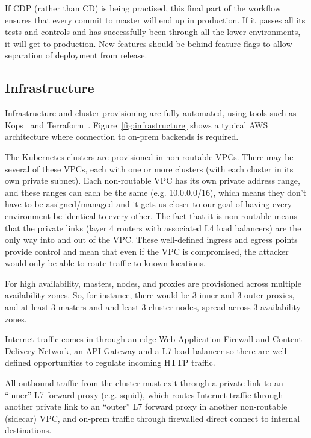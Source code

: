 \documentclass[reprint,amsmath,amssymb,aps]{revtex4-1}
\begin{document}
If CDP (rather than CD) is being practised, this final part of the workflow ensures that every commit to master will end up in production. If it passes all its tests and controls and has successfully been through all the lower environments, it will get to production. New features should be behind feature flags to allow separation of deployment from release.

\subsection{\label{sec:infrastructure}Infrastructure}

Infrastructure and cluster provisioning are fully automated, using tools such as Kops~\cite{kubernet77:online} and Terraform~\cite{Terrafor77:online}. Figure~\ref{fig:infrastructure} shows a typical AWS architecture where connection to on-prem backends is required.

The Kubernetes clusters are provisioned in non-routable VPCs. There may be several of these VPCs, each with one or more clusters (with each cluster in its own private subnet). Each non-routable VPC has its own private address range, and these ranges can each be the same (e.g. 10.0.0.0/16), which means they don't have to be assigned/managed and it gets us closer to our goal of having every environment be identical to every other. The fact that it is non-routable means that the private links (layer 4 routers with associated L4 load balancers) are the only way into and out of the VPC. These well-defined ingress and egress points provide control and mean that even if the VPC is compromised, the attacker would only be able to route traffic to known locations.

For high availability, masters, nodes, and proxies are provisioned across multiple availability zones. So, for instance, there would be 3 inner and 3 outer proxies, and at least 3 masters and and least 3 cluster nodes, spread across 3 availability zones.

Internet traffic comes in through an edge Web Application Firewall and Content Delivery Network, an API Gateway and a L7 load balancer so there are well defined opportunities to regulate incoming HTTP traffic.

All outbound traffic from the cluster must exit through a private link to an “inner” L7 forward proxy (e.g. squid), which routes Internet traffic through another private link to an “outer” L7 forward proxy in another non-routable (sidecar) VPC, and on-prem traffic through firewalled direct connect to internal destinations.
\end{document}

